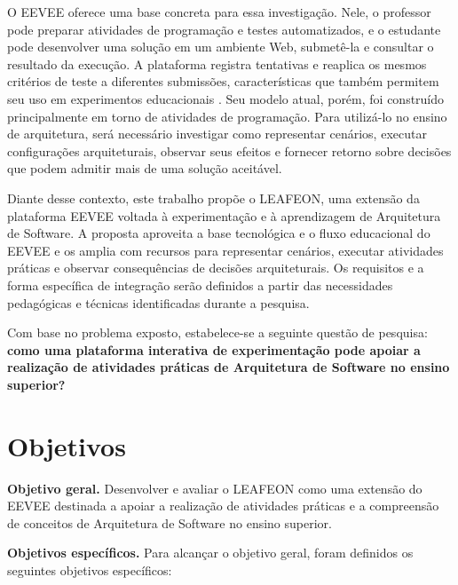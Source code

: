 O EEVEE oferece uma base concreta para essa investigação. Nele, o professor
pode preparar atividades de programação e testes automatizados, e o estudante
pode desenvolver uma solução em um ambiente Web, submetê-la e consultar o
resultado da execução. A plataforma registra tentativas e reaplica os mesmos
critérios de teste a diferentes submissões, características que também permitem
seu uso em experimentos educacionais \cite{eevee_repository_2026}. Seu modelo
atual, porém, foi construído principalmente em torno de atividades de
programação. Para utilizá-lo no ensino de arquitetura, será necessário
investigar como representar cenários, executar configurações arquiteturais,
observar seus efeitos e fornecer retorno sobre decisões que podem admitir mais
de uma solução aceitável.

Diante desse contexto, este trabalho propõe o LEAFEON, uma extensão da
plataforma EEVEE voltada à experimentação e à aprendizagem de Arquitetura de
Software. A proposta aproveita a base tecnológica e o fluxo educacional do
EEVEE e os amplia com recursos para representar cenários, executar atividades
práticas e observar consequências de decisões arquiteturais. Os requisitos e a
forma específica de integração serão definidos a partir das necessidades
pedagógicas e técnicas identificadas durante a pesquisa.

Com base no problema exposto, estabelece-se a seguinte questão de pesquisa:
\textbf{como uma plataforma interativa de experimentação pode apoiar a
realização de atividades práticas de Arquitetura de Software no ensino
superior?}

\section{Objetivos}
\label{sec:objetivos}

\textbf{Objetivo geral.} Desenvolver e avaliar o LEAFEON como uma extensão do
EEVEE destinada a apoiar a realização de atividades práticas e a compreensão de
conceitos de Arquitetura de Software no ensino superior.

\textbf{Objetivos específicos.} Para alcançar o objetivo geral, foram definidos
os seguintes objetivos específicos:

